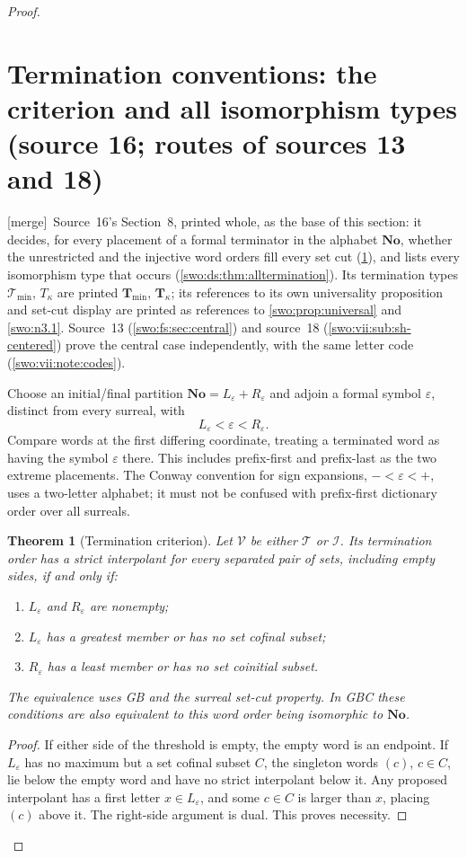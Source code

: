 \documentclass[11pt]{article}
\newtheorem{theorem}{Theorem}[section]
\theoremstyle{definition}
\theoremstyle{remark}
\newcommand{\No}{\mathbf{No}}
\newcommand{\Words}{\mathcal I}
\newcommand{\WordsAll}{\mathcal T}
\newcommand{\merge}{\textsf{[merge]}}
\begin{document}
\begin{proof}
\section{Termination conventions: the criterion and all isomorphism types (source 16; routes of sources 13 and 18)}\label{swo:ds:sec:termination}

\merge\ Source~16's Section~8, printed whole, as the base of this section:
it decides, for every placement of a formal terminator in the alphabet
$\No$, whether the unrestricted and the injective word orders fill every set
cut (\cref{swo:ds:thm:terminator}), and lists every isomorphism type that
occurs (\cref{swo:ds:thm:alltermination}). Its termination types
$\mathcal T_{\min}$, $T_\kappa$ are printed $\mathbf T_{\min}$,
$\mathbf T_\kappa$; its references to its own universality proposition and
set-cut display are printed as references to \cref{swo:prop:universal} and
\cref{swo:n3.1}. Source~13 (\cref{swo:fs:sec:central}) and source~18
(\cref{swo:vii:sub:sh-centered}) prove the central case independently, with the
same letter code (\cref{swo:vii:note:codes}).

Choose an initial/final partition $\No=L_\varepsilon+R_\varepsilon$ and
adjoin a formal symbol $\varepsilon$, distinct from every surreal, with
\[
 L_\varepsilon<\varepsilon<R_\varepsilon.
\]
Compare words at the first differing coordinate, treating a terminated
word as having the symbol $\varepsilon$ there. This includes prefix-first
and prefix-last as the two extreme placements. The Conway convention for
sign expansions, $-<\varepsilon<+$, uses a two-letter alphabet; it must
not be confused with prefix-first dictionary order over all surreals.

\begin{theorem}[Termination criterion]\label{swo:ds:thm:terminator}
Let $\mathcal V$ be either $\WordsAll$ or $\Words$. Its termination order
has a strict interpolant for every separated pair of sets, including
empty sides, if and only if:
\begin{enumerate}
\item $L_\varepsilon$ and $R_\varepsilon$ are nonempty;
\item $L_\varepsilon$ has a greatest member or has no set cofinal subset;
\item $R_\varepsilon$ has a least member or has no set coinitial subset.
\end{enumerate}
The equivalence uses GB and the surreal set-cut property. In GBC these
conditions are also equivalent to this word order being isomorphic to
$\No$.
\end{theorem}
\begin{proof}
If either side of the threshold is empty, the empty word is an endpoint.
If $L_\varepsilon$ has no maximum but a set cofinal subset $C$, the
singleton words $(c)$, $c\in C$, lie below the empty word and have no
strict interpolant below it. Any proposed interpolant has a first letter
$x\in L_\varepsilon$, and some $c\in C$ is larger than $x$, placing
$(c)$ above it. The right-side argument is dual. This proves necessity.


\end{proof}
\end{proof}
\end{document}
